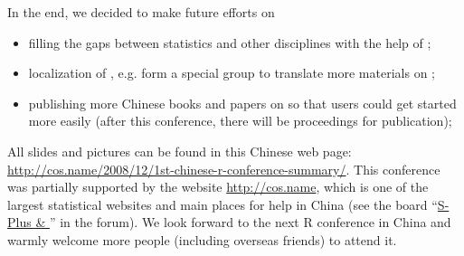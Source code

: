 In the end, we decided to make future efforts on

\begin{itemize}
  \item filling the gaps between statistics and other disciplines
  with the help of \R{};
  \item localization of \R{}, e.g. form a special group to translate
  more materials on \R{};
  \item publishing more Chinese books and papers on \R{} so that
  users could get started more easily (after this conference, there
  will be proceedings for publication);
\end{itemize}

All slides and pictures can be found in this Chinese web page:
\url{http://cos.name/2008/12/1st-chinese-r-conference-summary/}.
This conference was partially supported by the website
\url{http://cos.name}, which is one of the largest statistical
websites and main places for \R{} help in China (see the board
``\href{http://cos.name/bbs/thread.php?fid=15}{S-Plus \& \R{}}'' in
the forum). We look forward to the next R conference in China and
warmly welcome more people (including overseas friends) to attend
it.

\address{Yihui Xie\\
School of Statistics, Room 1037, Mingde Main Building,\\
Renmin University of China, Beijing, 100872, China}
